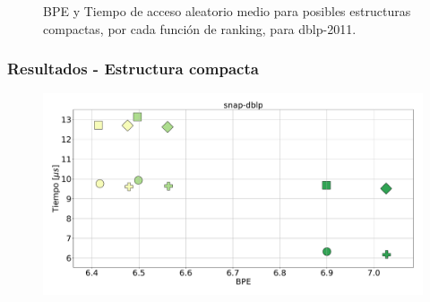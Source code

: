 \begin{frame}
\begin{figure}
\begin{minipage}{1\textwidth}
\begin{minipage}{0.15\textwidth}
    		\end{minipage}	
    	\end{minipage}

	\caption{BPE y Tiempo de acceso aleatorio medio para posibles estructuras compactas, por cada función de ranking, para dblp-2011.}
\end{figure}

\end{frame}

\begin{frame}
\frametitle{Resultados - Estructura compacta}

\begin{figure}
	\centering
	
    	\begin{minipage}{1\textwidth}
    		\centering
    		\begin{minipage}{0.8\textwidth}
    			\centering
    			\includegraphics[width=1\linewidth]{../img/sdsl/aleatorioBig/snap-dblp.pdf}
    		\end{minipage}
    		\begin{minipage}{0.15\textwidth}
    			\centering

\end{minipage}
\end{minipage}
\end{figure}
\end{frame}
